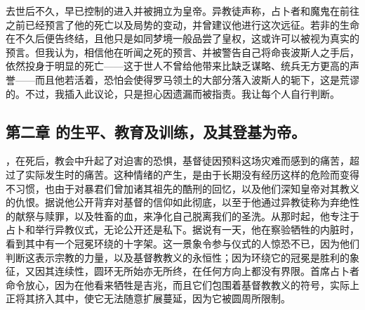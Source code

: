 去世后不久，早已控制的进入并被拥立为皇帝。异教徒声称，占卜者和魔鬼在前往之前已经预言了他的死亡以及局势的变动，并曾建议他进行这次远征。若非的生命在不久后便告终结，且他只是如同梦境一般品尝了皇权，这或许可以被视为真实的预言。但我认为，相信他在听闻之死的预言、并被警告自己将命丧波斯人之手后，依然投身于明显的死亡——这于世人不曾给他带来比缺乏谋略、统兵无方更高的声誉——而且他若活着，恐怕会使得罗马领土的大部分落入波斯人的轭下，这是荒谬的。不过，我插入此议论，只是担心因遗漏而被指责。我让每个人自行判断。\par


\subsection{第二章 的生平、教育及训练，及其登基为帝。}

，在死后，教会中升起了对迫害的恐惧，基督徒因预料这场灾难而感到的痛苦，超过了实际发生时的痛苦。这种情绪的产生，是由于长期没有经历这样的危险而变得不习惯，也由于对暴君们曾加诸其祖先的酷刑的回忆，以及他们深知皇帝对其教义的仇恨。据说他公开背弃对基督的信仰如此彻底，以至于他通过异教徒称为弃绝性的献祭与赎罪，以及牲畜的血，来净化自己脱离我们的圣洗。从那时起，他专注于占卜和举行异教仪式，无论公开还是私下。据说有一天，他在察验牺牲的内脏时，看到其中有一个冠冕环绕的十字架。这一景象令参与仪式的人惊恐不已，因为他们判断这表示宗教的力量，以及基督教教义的永恒性；因为环绕它的冠冕是胜利的象征，又因其连续性，圆环无所始亦无所终，在任何方向上都没有界限。首席占卜者命令放心，因为在他看来牺牲是吉兆，而且它们包围着基督教教义的符号，实际上正将其挤入其中，使它无法随意扩展蔓延，因为它被圆周所限制。\par

